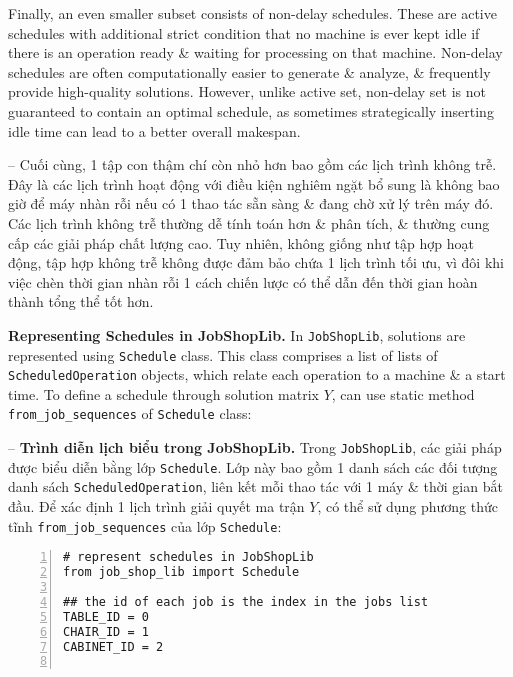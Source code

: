 \documentclass{article}
\begin{document}
\begin{itemize}
\begin{itemize}
\begin{itemize}
            Finally, an even smaller subset consists of non-delay schedules. These are active schedules with additional strict condition that no machine is ever kept idle  if there is an operation ready \& waiting for processing on that machine. Non-delay schedules are often computationally easier to generate \& analyze, \& frequently provide high-quality solutions. However, unlike active set, non-delay set is not guaranteed to contain an optimal schedule, as sometimes strategically inserting idle time can lead to a better overall makespan.

            -- Cuối cùng, 1 tập con thậm chí còn nhỏ hơn bao gồm các lịch trình không trễ. Đây là các lịch trình hoạt động với điều kiện nghiêm ngặt bổ sung là không bao giờ để máy nhàn rỗi nếu có 1 thao tác sẵn sàng \& đang chờ xử lý trên máy đó. Các lịch trình không trễ thường dễ tính toán hơn \& phân tích, \& thường cung cấp các giải pháp chất lượng cao. Tuy nhiên, không giống như tập hợp hoạt động, tập hợp không trễ không được đảm bảo chứa 1 lịch trình tối ưu, vì đôi khi việc chèn thời gian nhàn rỗi 1 cách chiến lược có thể dẫn đến thời gian hoàn thành tổng thể tốt hơn.

            {\bf Representing Schedules in JobShopLib.} In {\tt JobShopLib}, solutions are represented using {\tt Schedule} class. This class comprises a list of lists of {\tt ScheduledOperation} objects, which relate each operation to a machine \& a start time. To define a schedule through solution matrix $Y$, can use static method \verb|from_job_sequences| of {\tt Schedule} class:

            -- {\bf Trình diễn lịch biểu trong JobShopLib.} Trong {\tt JobShopLib}, các giải pháp được biểu diễn bằng lớp {\tt Schedule}. Lớp này bao gồm 1 danh sách các đối tượng danh sách {\tt ScheduledOperation}, liên kết mỗi thao tác với 1 máy \& thời gian bắt đầu. Để xác định 1 lịch trình giải quyết ma trận $Y$, có thể sử dụng phương thức tĩnh \verb|from_job_sequences| của lớp {\tt Schedule}:
            \begin{Verbatim}[numbers=left,xleftmargin=5mm]
# represent schedules in JobShopLib
from job_shop_lib import Schedule

## the id of each job is the index in the jobs list
TABLE_ID = 0
CHAIR_ID = 1
CABINET_ID = 2


\end{Verbatim}
\end{itemize}
\end{itemize}
\end{itemize}
\end{document}
